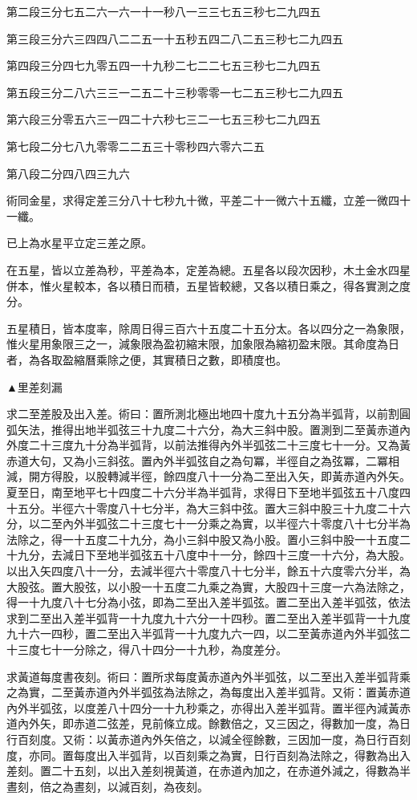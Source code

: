 第二段三分七五二六一六一十一秒八一三三七五三秒七二九四五

第三段三分六三四四八二二五一十五秒五四二八二五三秒七二九四五

第四段三分四七九零五四一十九秒二七二二七五三秒七二九四五

第五段三分二八六三三一二五二十三秒零零一七二五三秒七二九四五

第六段三分零五六三一四二十六秒七三二一七五三秒七二九四五

第七段二分七八九零零二二五三十零秒四六零六二五

第八段二分四八四三九六

術同金星，求得定差三分八十七秒九十微，平差二十一微六十五纖，立差一微四十一纖。

已上為水星平立定三差之原。

在五星，皆以立差為秒，平差為本，定差為總。五星各以段次因秒，木土金水四星併本，惟火星較本，各以積日而積，五星皆較總，又各以積日乘之，得各實測之度分。

五星積日，皆本度率，除周日得三百六十五度二十五分太。各以四分之一為象限，惟火星用象限三之一，減象限為盈初縮末限，加象限為縮初盈末限。其命度為日者，為各取盈縮曆乘除之便，其實積日之數，即積度也。

▲里差刻漏

求二至差股及出入差。術曰：置所測北極出地四十度九十五分為半弧背，以前割圓弧矢法，推得出地半弧弦三十九度二十六分，為大三斜中股。置測到二至黃赤道內外度二十三度九十分為半弧背，以前法推得內外半弧弦二十三度七十一分。又為黃赤道大句，又為小三斜弦。置內外半弧弦自之為句冪，半徑自之為弦冪，二冪相減，開方得股，以股轉減半徑，餘四度八十一分為二至出入矢，即黃赤道內外矢。夏至日，南至地平七十四度二十六分半為半弧背，求得日下至地半弧弦五十八度四十五分。半徑六十零度八十七分半，為大三斜中弦。置大三斜中股三十九度二十六分，以二至內外半弧弦二十三度七十一分乘之為實，以半徑六十零度八十七分半為法除之，得一十五度二十九分，為小三斜中股又為小股。置小三斜中股一十五度二十九分，去減日下至地半弧弦五十八度中十一分，餘四十三度一十六分，為大股。以出入矢四度八十一分，去減半徑六十零度八十七分半，餘五十六度零六分半，為大股弦。置大股弦，以小股一十五度二九乘之為實，大股四十三度一六為法除之，得一十九度八十七分為小弦，即為二至出入差半弧弦。置二至出入差半弧弦，依法求到二至出入差半弧背一十九度九十六分一十四秒。置二至出入差半弧背一十九度九十六一四秒，置二至出入半弧背一十九度九六一四，以二至黃赤道內外半弧弦二十三度七十一分除之，得八十四分一十九秒，為度差分。

求黃道每度書夜刻。術曰：置所求每度黃赤道內外半弧弦，以二至出入差半弧背乘之為實，二至黃赤道內外半弧弦為法除之，為每度出入差半弧背。又術：置黃赤道內外半弧弦，以度差八十四分一十九秒乘之，亦得出入差半弧背。置半徑內減黃赤道內外矢，即赤道二弦差，見前條立成。餘數倍之，又三因之，得數加一度，為日行百刻度。又術：以黃赤道內外矢倍之，以減全徑餘數，三因加一度，為日行百刻度，亦同。置每度出入半弧背，以百刻乘之為實，日行百刻為法除之，得數為出入差刻。置二十五刻，以出入差刻視黃道，在赤道內加之，在赤道外減之，得數為半晝刻，倍之為晝刻，以減百刻，為夜刻。

